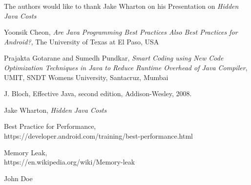 \documentclass[journal]{IEEEtran}
\begin{document}
The authors would like to thank Jake Wharton on his Presentation on \emph{Hidden Java Costs}

\begin{thebibliography}{1}

\bibitem{}
Yoonsik Cheon, \emph{Are Java Programming Best Practices Also Best Practices for Android?}, The University of Texas at El Paso, USA

\bibitem{}
Prajakta Gotarane and Sumedh Pundkar, \emph{Smart Coding using New Code Optimization Techniques in Java to Reduce Runtime Overhead of Java Compiler}, UMIT, SNDT Womens University, Santacruz, Mumbai

\bibitem{}
J. Bloch, Effective Java, second edition, Addison-Wesley, 2008.

\bibitem{}
Jake Wharton, \emph{Hidden Java Costs}

\bibitem{}
Best Practice for Performance,\\
https://developer.android.com/training/best-performance.html 

\bibitem{}
Memory Leak,\\
https://en.wikipedia.org/wiki/Memory-leak

\end{thebibliography}

\begin{IEEEbiography}{John Doe}
\blindtext
\end{IEEEbiography}
\end{document}
